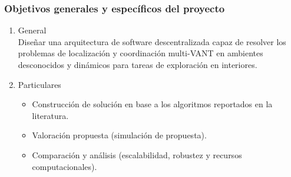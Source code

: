 \documentclass[
	11pt, %
	aspectratio=169, %
]{beamer}
\begin{document}
\begin{frame}
  
  \frametitle{Objetivos generales y específicos del proyecto}

  \begin{enumerate}
  \item<1-> General \\

    Diseñar una arquitectura de software descentralizada capaz de resolver los problemas de localización y coordinación multi-VANT en ambientes desconocidos y dinámicos para tareas de exploración en interiores.
        
  \item<2-> Particulares\\

    \begin{itemize}
    \item<1-> Construcción de solución en base a los algoritmos reportados en la literatura.
    \item<2-> Valoración propuesta (simulación de propuesta).
    \item<3-> Comparación y análisis (escalabilidad, robustez y recursos computacionales).
    \end{itemize}
    
  \end{enumerate}
\end{frame}

\end{document}
